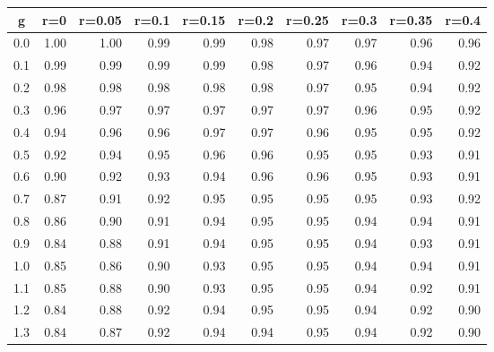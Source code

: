 %
\begin{table}[!tbp]
 \begin{center}
 \begin{tabular}{rrrrrrrrrr}\hline\hline
\multicolumn{1}{c}{g}&\multicolumn{1}{c}{r=0}&\multicolumn{1}{c}{r=0.05}&\multicolumn{1}{c}{r=0.1}&\multicolumn{1}{c}{r=0.15}&\multicolumn{1}{c}{r=0.2}&\multicolumn{1}{c}{r=0.25}&\multicolumn{1}{c}{r=0.3}&\multicolumn{1}{c}{r=0.35}&\multicolumn{1}{c}{r=0.4}\tabularnewline
\hline
0.0&1.00&1.00&0.99&0.99&0.98&0.97&0.97&0.96&0.96\tabularnewline
0.1&0.99&0.99&0.99&0.99&0.98&0.97&0.96&0.94&0.92\tabularnewline
0.2&0.98&0.98&0.98&0.98&0.98&0.97&0.95&0.94&0.92\tabularnewline
0.3&0.96&0.97&0.97&0.97&0.97&0.97&0.96&0.95&0.92\tabularnewline
0.4&0.94&0.96&0.96&0.97&0.97&0.96&0.95&0.95&0.92\tabularnewline
0.5&0.92&0.94&0.95&0.96&0.96&0.95&0.95&0.93&0.91\tabularnewline
0.6&0.90&0.92&0.93&0.94&0.96&0.96&0.95&0.93&0.91\tabularnewline
0.7&0.87&0.91&0.92&0.95&0.95&0.95&0.95&0.93&0.92\tabularnewline
0.8&0.86&0.90&0.91&0.94&0.95&0.95&0.94&0.94&0.91\tabularnewline
0.9&0.84&0.88&0.91&0.94&0.95&0.95&0.94&0.93&0.91\tabularnewline
1.0&0.85&0.86&0.90&0.93&0.95&0.95&0.94&0.94&0.91\tabularnewline
1.1&0.85&0.88&0.90&0.93&0.95&0.95&0.94&0.92&0.91\tabularnewline
1.2&0.84&0.88&0.92&0.94&0.95&0.95&0.94&0.92&0.90\tabularnewline
1.3&0.84&0.87&0.92&0.94&0.94&0.95&0.94&0.92&0.90\tabularnewline
\hline
\end{tabular}

\end{center}

\end{table}

